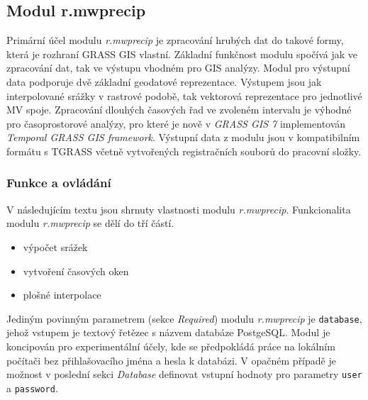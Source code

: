 \documentclass[a4paper,12pt,oneside]{report}
\begin{document}
\subsection{Modul r.mwprecip}
Primární účel modulu \textit{r.mwprecip} je zpracování hrubých dat do
takové formy, která je rozhraní GRASS GIS vlastní. Základní funkčnost
modulu spočívá jak ve zpracování dat, tak ve výstupu vhodném pro GIS
analýzy. Modul pro výstupní data podporuje dvě základní geodatové
reprezentace. Výstupem jsou jak interpolované srážky v rastrové
podobě, tak vektorová reprezentace pro jednotlivé MV spoje.
Zpracování dlouhých časových řad ve zvoleném intervalu je výhodné pro
časoprostorové analýzy, pro které je nově v \textit{GRASS GIS 7}
implementován \textit{Temporal GRASS GIS framework}. Výstupní data z
modulu jsou v kompatibilním formátu s TGRASS včetně vytvořených
registračních souborů do pracovní složky.

 
\subsubsection{Funkce a ovládání}
V následujícím textu jsou shrnuty vlastnosti modulu
\textit{r.mwprecip}. Funkcionalita modulu \textit{r.mwprecip} se dělí
do tří částí.

\begin{itemize}
\item výpočet srážek
\item vytvoření časových oken
\item plošné interpolace 
\end{itemize}

Jediným povinným parametrem (sekce \textit{Required}) modulu
\textit{r.mwprecip} je \texttt{database}, jehož vstupem je textový
řetězec s názvem databáze PostgeSQL. Modul je koncipován pro
experimentální účely, kde se předpokládá práce na lokálním počítači
bez přihlašovacího jména a hesla k databázi. V opačném případě je
možnost v poslední sekci \textit{Database} definovat vstupní hodnoty
pro parametry \texttt{user} a \texttt{password}.
\end{document}
